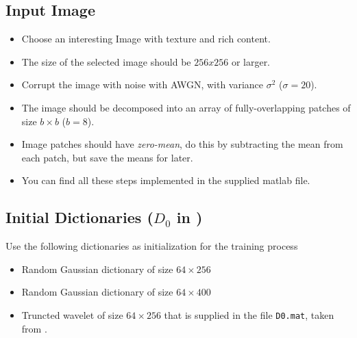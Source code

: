 \documentclass[]{article}
\begin{document}
		\subsection{Input Image}
		\begin{itemize}
			\item Choose an interesting Image with texture and rich content. 
			\item The size of the selected image should be $256x256$ or larger.
			\item Corrupt the image with noise with AWGN, with variance $\sigma^2$ ($\sigma = 20$). 
			\item The image should be decomposed into an array of fully-overlapping patches of size $b\times b$ ($b=8$). 
			\item Image patches should have \emph{zero-mean}, do this by subtracting the mean from each patch, but save the means for later. 
			\item You can find all these steps implemented in the supplied matlab file.   
			
		\end{itemize}
		\subsection{Initial Dictionaries ($D_0$ in \cite{mairal2009online})}
		Use the following dictionaries as initialization for the training process
		\begin{itemize}
			\item Random Gaussian dictionary of size $64\times 256$ 
			\item Random Gaussian dictionary of size $64\times 400$   
			\item Truncted wavelet of size $64\times 256$ that is supplied in the file \lstinline|D0.mat|, taken from \cite{sulam2016trainlets}. 
		\end{itemize}
		
\end{document}
